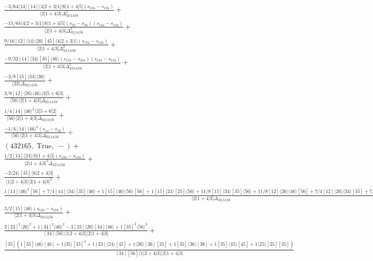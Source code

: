 \documentclass[varwidth, border=5pt]{standalone}
\begin{document}
\begin{my}
$\begin{gathered}
\scriptscriptstyle\frac{-3/64⟨14⟩[14]⟨4|2+3|1]⟨6|1+4|5](s_{134}-s_{124})}{⟨2|1+4|3]Δ_{32|14|56}^2}+\\
\scriptscriptstyle\frac{-15/64⟨4|2+3|1]⟨6|1+4|5](s_{32}-s_{56})(s_{134}-s_{124})}{⟨2|1+4|3]Δ_{32|14|56}^2}+\\
\scriptscriptstyle\frac{9/16[12]⟨14⟩⟨26⟩[45]⟨4|2+3|1](s_{134}-s_{124})}{⟨2|1+4|3]Δ_{32|14|56}^2}+\\
\scriptscriptstyle\frac{-9/32[14]⟨34⟩[35]⟨46⟩(s_{132}-s_{324})(s_{134}-s_{124})}{⟨2|1+4|3]Δ_{32|14|56}^2}+\\
\scriptscriptstyle\frac{-3/8[15]⟨34⟩⟨36⟩}{⟨23⟩Δ_{32|14|56}}+\\
\scriptscriptstyle\frac{3/8[12]⟨26⟩⟨46⟩⟨3|5+6|3]}{⟨56⟩⟨2|1+4|3]Δ_{32|14|56}}+\\
\scriptscriptstyle\frac{1/4[14]⟨46⟩^2⟨2|5+6|2]}{⟨56⟩⟨2|1+4|3]Δ_{32|14|56}}+\\
\scriptscriptstyle\frac{-1/4[14]⟨46⟩^2(s_{14}-s_{32})}{⟨56⟩⟨2|1+4|3]Δ_{32|14|56}}+\\
\scriptscriptstyle(432165,\;\text{True},\;-)+\\
\scriptscriptstyle\frac{1/2[13]⟨24⟩⟨6|1+4|5](s_{134}-s_{124})}{⟨2|1+4|3]^2Δ_{32|14|56}}+\\
\scriptscriptstyle\frac{-2⟨24⟩[35]⟨6|2+4|3]}{⟨1|2+4|3]⟨2|1+4|3]^2}+\\
\scriptscriptstyle\frac{1[14]⟨46⟩^2[56]+7/4[14]⟨34⟩[35]⟨46⟩+1[15]⟨46⟩⟨56⟩[56]+1[15]⟨24⟩[25]⟨56⟩+11/8[15]⟨34⟩[35]⟨56⟩+11/8[12]⟨26⟩⟨46⟩[56]+7/4[12]⟨26⟩⟨34⟩[35]+7/4[12]⟨24⟩[25]⟨26⟩}{⟨2|1+4|3]Δ_{32|14|56}}+\\
\scriptscriptstyle\frac{3/2[15]⟨46⟩(s_{134}-s_{124})}{⟨2|1+4|3]Δ_{32|14|56}}+\\
\scriptscriptstyle\frac{2[23]^2⟨26⟩^2+1[34]^2⟨46⟩^2-3[23]⟨26⟩[34]⟨46⟩+1[35]^2⟨56⟩^2}{[34]⟨56⟩⟨1|2+4|3]⟨2|1+4|3]}+\\
\scriptscriptstyle\frac{[35](1[35]⟨46⟩[46]+1⟨35⟩[35]^2+1[23]⟨24⟩[45]+1⟨26⟩[26][35]+1[35]⟨36⟩[36]+1[35]⟨45⟩[45]+1⟨25⟩[25][35])}{[34][56]⟨1|2+4|3]⟨2|1+4|3]}\phantom{+}
\end{gathered}$
\end{my}
\end{document}
